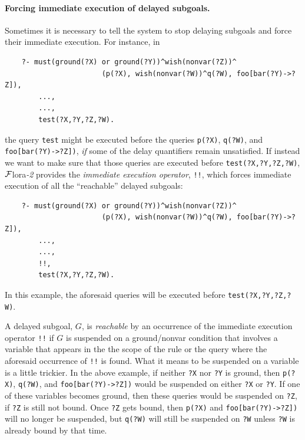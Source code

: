 \documentclass[11pt]{article}
\newcommand{\FLORA}{{\mbox{\sc ${\cal F}${lora}\rm\emph{-2}}}\xspace}
\newcommand{\FLSYSTEM}{\FLORA}
\begin{document}
\index{!!}
\paragraph{Forcing immediate execution of delayed subgoals.}
Sometimes it is necessary to tell the system to stop delaying
subgoals and force their immediate execution.
For instance, in
\begin{verbatim}
    ?- must(ground(?X) or ground(?Y))^wish(nonvar(?Z))^
                       (p(?X), wish(nonvar(?W))^q(?W), foo[bar(?Y)->?Z]),
        ...,
        ...,
        test(?X,?Y,?Z,?W).
\end{verbatim}
the query \texttt{test} might be executed before the queries \texttt{p(?X)},
\texttt{q(?W)}, and \texttt{foo[bar(?Y)->?Z])}, \emph{if} some of the
delay quantifiers remain unsatisfied. If instead we want
to make sure that those queries are executed before
\texttt{test(?X,?Y,?Z,?W)}, \FLSYSTEM provides the \emph{immediate execution
operator}, \texttt{!!},
which forces immediate execution of all the ``reachable'' delayed subgoals:
\begin{verbatim}
    ?- must(ground(?X) or ground(?Y))^wish(nonvar(?Z))^
                       (p(?X), wish(nonvar(?W))^q(?W), foo[bar(?Y)->?Z]),
        ...,
        ...,
        !!,
        test(?X,?Y,?Z,?W).
\end{verbatim}
In this example, the aforesaid queries will be executed before
\texttt{test(?X,?Y,?Z,?W)}. 

A delayed subgoal, $G$, is \emph{reachable} by an occurrence of
the immediate execution
operator \texttt{!!} 
if $G$ is suspended on a ground/nonvar condition that
involves a variable that appears in the the scope of the rule or the query
where the aforesaid occurrence of \texttt{!!} is found. 
What it means to be suspended on a variable is a little trickier.
In the above example, if neither \texttt{?X} nor \texttt{?Y} is ground,
then \texttt{p(?X)}, \texttt{q(?W)}, and \texttt{foo[bar(?Y)->?Z])} would
be suspended on either \texttt{?X} or \texttt{?Y}. If one of these
variables becomes ground, then these queries would be suspended on
\texttt{?Z}, if \texttt{?Z} is still not bound.  Once \texttt{?Z}  gets bound,
then \texttt{p(?X)} and \texttt{foo[bar(?Y)->?Z])} will no longer be
suspended, but \texttt{q(?W)} will still be suspended on \texttt{?W} unless
\texttt{?W} is already bound by that time.   
\end{document}
